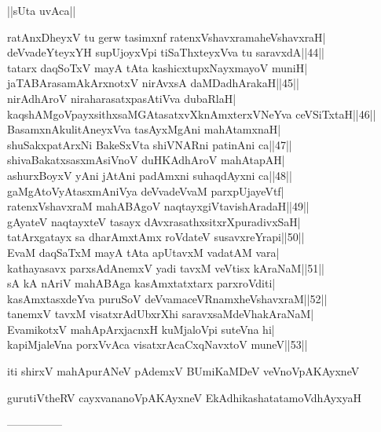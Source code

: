 \documentclass{article}
\begin{document}
\begin{center}
||sUta uvAca||
\end{center}

ratAnxDheyxV tu gerw tasimxnf ratenxVshavxramaheVshavxraH|\\
deVvadeYteyxYH supUjoyxVpi tiSaThxteyxVva tu saravxdA||44||\\
tatarx daqSoTxV mayA tAta kashicxtupxNayxmayoV muniH|\\
jaTABArasamAkArxnotxV nirAvxsA daMDadhArakaH||45||\\
nirAdhAroV niraharasatxpasAtiVva dubaRlaH|\\
kaqshAMgoVpayxsithxsaMGAtasatxvXknAmxterxVNeYva ceVSiTxtaH||46||\\
BasamxnAkulitAneyxVva tasAyxMgAni mahAtamxnaH|\\
shuSakxpatArxNi BakeSxVta shiVNARni patinAni ca||47||\\
shivaBakatxsasxmAsiVnoV duHKAdhAroV mahAtapAH|\\
ashurxBoyxV yAni jAtAni padAmxni suhaqdAyxni ca||48||\\
gaMgAtoVyAtasxmAniVya deVvadeVvaM parxpUjayeVtf|\\
ratenxVshavxraM mahABAgoV naqtayxgiVtavishAradaH||49||\\
gAyateV naqtayxteV tasayx dAvxrasathxsitxrXpuradivxSaH|\\
tatArxgatayx sa dharAmxtAmx roVdateV susavxreYrapi||50||\\
EvaM daqSaTxM mayA tAta apUtavxM vadatAM vara|\\
kathayasavx parxsAdAnemxV yadi tavxM veVtisx kAraNaM||51||\\
sA kA nAriV mahABAga kasAmxtatxtarx parxroVditi|\\
kasAmxtasxdeYva puruSoV deVvamaceVRnamxheVshavxraM||52||\\
tanemxV tavxM visatxrAdUbxrXhi saravxsaMdeVhakAraNaM|\\
EvamikotxV mahApArxjacnxH kuMjaloVpi suteVna hi|\\
kapiMjaleVna porxVvAca visatxrAcaCxqNavxtoV muneV||53||

\begin{center}
iti shirxV mahApurANeV pAdemxV BUmiKaMDeV veVnoVpAKAyxneV
\end{center}

\begin{center}
gurutiVtheRV cayxvananoVpAKAyxneV EkAdhikashatatamoVdhAyxyaH
\end{center}

\begin{center}
---------------
\end{center}
\end{document}
